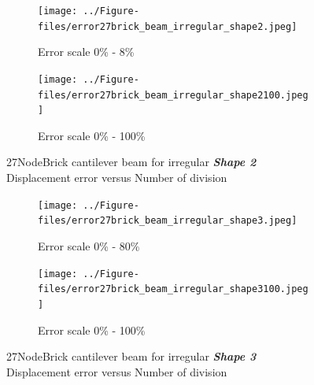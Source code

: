 \documentclass[fleqn,11pt]{article}
\begin{document}



\begin{figure}[H]
  \begin{subfigure}{0.5\textwidth}
    \centering
    \texttt{[image: ../Figure-files/error27brick\_beam\_irregular\_shape2.jpeg]}
    \caption{Error scale 0\% - 8\%}
  \end{subfigure}
  \begin{subfigure}{0.5\textwidth}
    \centering
    \texttt{[image: ../Figure-files/error27brick\_beam\_irregular\_shape2100.jpeg]}
    \caption{Error scale 0\% - 100\%}
  \end{subfigure}
  \captionsetup{justification=centering,margin=3cm}
  \caption{27NodeBrick cantilever beam for irregular \textbf{\emph{Shape 2}}\\
      Displacement error   versus   Number of division}
  \label{fig shape 2 27NodeBrick cantilever beam for irregular more elements}
\end{figure}




\begin{figure}[H]
  \begin{subfigure}{0.5\textwidth}
    \centering
    \texttt{[image: ../Figure-files/error27brick\_beam\_irregular\_shape3.jpeg]}
    \caption{Error scale 0\% - 80\%}
  \end{subfigure}
  \begin{subfigure}{0.5\textwidth}
    \centering
    \texttt{[image: ../Figure-files/error27brick\_beam\_irregular\_shape3100.jpeg]}
    \caption{Error scale 0\% - 100\%}
  \end{subfigure}
  \captionsetup{justification=centering,margin=3cm}
  \caption{27NodeBrick cantilever beam for irregular \textbf{\emph{Shape 3}}\\
      Displacement error   versus   Number of division}
  \label{fig shape 3 27NodeBrick cantilever beam for irregular more elements}
\end{figure}
\end{document}
